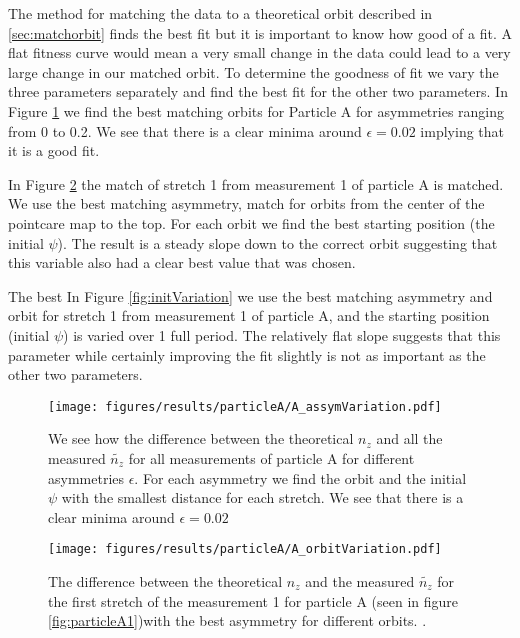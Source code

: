  The method for matching the data to a theoretical orbit described in \ref{sec:matchorbit} finds the best fit but it is important to know how good of a fit. A flat fitness curve would mean a very small change in the data could lead to a very large change in our matched orbit. To determine the goodness of fit we vary the three parameters separately and find the best fit for the other two parameters. In Figure \ref{fig:asymVariation} we find the best matching orbits for Particle A for asymmetries ranging from 0 to 0.2. We see that there is a clear minima around $\epsilon = 0.02$ implying that it is a good fit.
 
 In Figure \ref{fig:orbitVariation} the match of stretch 1 from measurement 1 of particle A is matched. We use the best matching asymmetry, match for orbits from the center of the pointcare map to the top. For each orbit we find the best starting position (the initial $\psi$). The result is a steady slope down to the correct orbit suggesting that this variable also had a clear best value that was chosen. 
 
 The best In Figure \ref{fig:initVariation} we use the best matching 		asymmetry and orbit for stretch 1 from measurement 1 of particle A, and the starting position (initial $\psi$) is varied over 1 full period. The relatively flat slope suggests that this parameter while certainly improving the fit slightly is not as important as the other two parameters. 
 
 \begin{figure}[H]
 \begin{center}
 \texttt{[image: figures/results/particleA/A\_assymVariation.pdf]}
 \end{center}
 \caption{We see how the difference between the theoretical $n_z$ and all the measured  $\widetilde{n_z}$ for all measurements of particle A for different asymmetries $\epsilon$. For each asymmetry we find the orbit and the initial $\psi$ with the smallest distance for each stretch. We see that there is a clear minima around $\epsilon = 0.02$}
 \label{fig:asymVariation}
 \end{figure}
 
 \begin{figure}[H]
 \begin{center}
 \texttt{[image: figures/results/particleA/A\_orbitVariation.pdf]}
 \end{center}
 \caption{The difference between the theoretical $n_z$ and the measured $\widetilde{n_z}$ for the first stretch of the measurement 1 for particle A (seen in figure \ref{fig:particleA1})with the best asymmetry for different orbits. .}
 \label{fig:orbitVariation}
 \end{figure}
 
